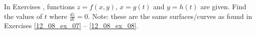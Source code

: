 {\noindent In Exercises} 
{,  functions $z=f(x,y)$, $x=g(t)$ and $y=h(t)$ are given. Find the values of $t$ where $\frac{dz}{dt}=0$. Note: these are the same surfaces/curves as found in Exercises \ref{12_08_ex_07} -- \ref{12_08_ex_08}.
}
